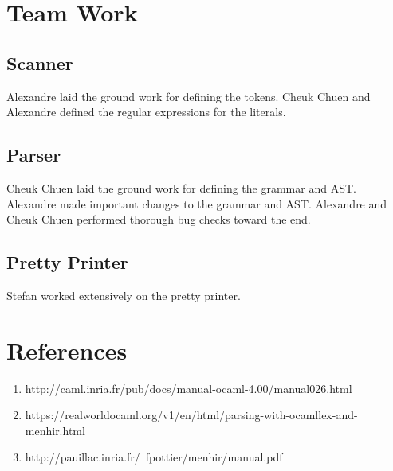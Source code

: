 \documentclass{article}
\begin{document}
\section*{Team Work}
\subsection*{Scanner}
Alexandre laid the ground work for defining the tokens. Cheuk Chuen and Alexandre defined the regular expressions for the literals.

\subsection*{Parser}
Cheuk Chuen laid the ground work for defining the grammar and AST. Alexandre made important changes to the grammar and AST. Alexandre and Cheuk Chuen performed thorough bug checks toward the end.

\subsection*{Pretty Printer}
Stefan worked extensively on the pretty printer.

\section*{References}
\begin{enumerate}
  \item http://caml.inria.fr/pub/docs/manual-ocaml-4.00/manual026.html
  \item https://realworldocaml.org/v1/en/html/parsing-with-ocamllex-and-menhir.html
  \item http://pauillac.inria.fr/~fpottier/menhir/manual.pdf
\end{enumerate}
\end{document}
